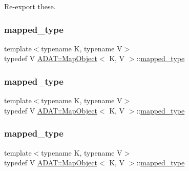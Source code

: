 Re-\/export these. 

\mbox{\label{classADAT_1_1MapObject_ad307fa02da187571a964db1e195a3caa}} 
\subsubsection{\texorpdfstring{mapped\_type}{mapped\_type}\hspace{0.1cm}{\footnotesize\ttfamily [1/3]}}
{\footnotesize\ttfamily template$<$typename K, typename V$>$ \\
typedef V \mbox{\hyperlink{classADAT_1_1MapObject}{A\+D\+A\+T\+::\+Map\+Object}}$<$ K, V $>$\+::\mbox{\hyperlink{classADAT_1_1MapObject_ad307fa02da187571a964db1e195a3caa}{mapped\+\_\+type}}}

\mbox{\label{classADAT_1_1MapObject_ad307fa02da187571a964db1e195a3caa}} 
\subsubsection{\texorpdfstring{mapped\_type}{mapped\_type}\hspace{0.1cm}{\footnotesize\ttfamily [2/3]}}
{\footnotesize\ttfamily template$<$typename K, typename V$>$ \\
typedef V \mbox{\hyperlink{classADAT_1_1MapObject}{A\+D\+A\+T\+::\+Map\+Object}}$<$ K, V $>$\+::\mbox{\hyperlink{classADAT_1_1MapObject_ad307fa02da187571a964db1e195a3caa}{mapped\+\_\+type}}}

\mbox{\label{classADAT_1_1MapObject_ad307fa02da187571a964db1e195a3caa}} 
\subsubsection{\texorpdfstring{mapped\_type}{mapped\_type}\hspace{0.1cm}{\footnotesize\ttfamily [3/3]}}
{\footnotesize\ttfamily template$<$typename K, typename V$>$ \\
typedef V \mbox{\hyperlink{classADAT_1_1MapObject}{A\+D\+A\+T\+::\+Map\+Object}}$<$ K, V $>$\+::\mbox{\hyperlink{classADAT_1_1MapObject_ad307fa02da187571a964db1e195a3caa}{mapped\+\_\+type}}}


